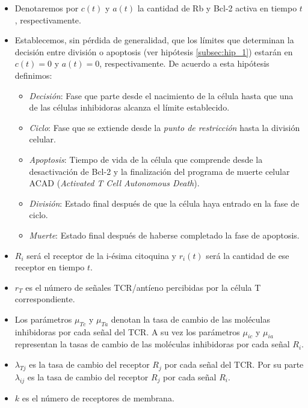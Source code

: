 \begin{itemize}
	\item Denotaremos por \textit{$c(t)$} y \textit{$a(t)$} la cantidad de Rb y Bcl-2 activa en tiempo $t$, respectivamente.

	\item Establecemos, sin pérdida de generalidad, que los límites que determinan la decisión entre división o apoptosis (ver hipótesis \ref{subsec:hip_1}) estarán en $c(t)=0$ y $a(t)=0$, respectivamente. De acuerdo a esta hipótesis definimos: 
	
	\begin{itemize}
		\item \textit{Decisión}: Fase que parte desde el nacimiento de la célula hasta que una de las células inhibidoras alcanza el límite establecido.
		
		\item \textit{Ciclo}: Fase que se extiende desde la \textit{punto de restricción} hasta la división celular.
		
		\item \textit{Apoptosis}: Tiempo de vida de la célula que comprende desde la desactivación de Bcl-2 y la finalización del programa de muerte celular ACAD (\textit{Activated T Cell Autonomous Death}).
		
		\item \textit{División}: Estado final después de que la célula haya entrado en la fase de ciclo.
		
		\item \textit{Muerte}: Estado final después de haberse completado la fase de apoptosis.
	\end{itemize}

	\item \textit{$R_{i}$} será el receptor de la i-ésima citoquina y \textit{$r_{i}(t)$} será la cantidad de ese receptor en tiempo $t$. 
	\item $r_{T}$ es el número de señales TCR/antíeno percibidas por la célula T correspondiente.
	
	\item Los parámetros $\mu_{Tc}$ y $\mu_{Ta}$ denotan la tasa de cambio de las moléculas inhibidoras por cada señal del TCR. A su vez los parámetros $\mu_{ic}$ y $\mu_{ia}$ representan la tasas de cambio de las moléculas inhibidoras por cada señal $R_i$.
	
	\item $\lambda_{Tj}$ es la tasa de cambio del receptor $R_{j}$ por cada señal del TCR. Por su parte $\lambda_{ij}$ es la tasa de cambio del receptor $R_j$ por cada señal $R_i$.
	
	\item $k$ es el número de receptores de membrana.
\end{itemize} 

